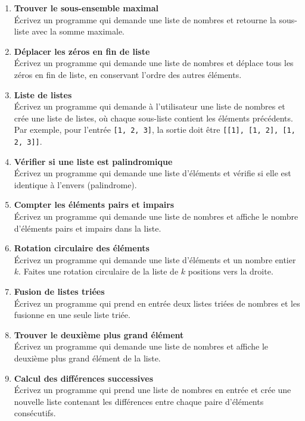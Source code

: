 \begin{enumerate}
    \item \textbf{Trouver le sous-ensemble maximal} \\
    Écrivez un programme qui demande une liste de nombres et retourne la sous-liste avec la somme maximale.

    \item \textbf{Déplacer les zéros en fin de liste} \\
    Écrivez un programme qui demande une liste de nombres et déplace tous les zéros en fin de liste, en conservant l'ordre des autres éléments.

    \item \textbf{Liste de listes} \\
    Écrivez un programme qui demande à l'utilisateur une liste de nombres et crée une liste de listes, où chaque sous-liste contient les éléments précédents. Par exemple, pour l'entrée \texttt{[1, 2, 3]}, la sortie doit être \texttt{[[1], [1, 2], [1, 2, 3]]}.

    \item \textbf{Vérifier si une liste est palindromique} \\
    Écrivez un programme qui demande une liste d'éléments et vérifie si elle est identique à l'envers (palindrome).

    \item \textbf{Compter les éléments pairs et impairs} \\
    Écrivez un programme qui demande une liste de nombres et affiche le nombre d'éléments pairs et impairs dans la liste.

    \item \textbf{Rotation circulaire des éléments} \\
    Écrivez un programme qui demande une liste d'éléments et un nombre entier $k$. Faites une rotation circulaire de la liste de $k$ positions vers la droite.

    \item \textbf{Fusion de listes triées} \\
    Écrivez un programme qui prend en entrée deux listes triées de nombres et les fusionne en une seule liste triée.

    \item \textbf{Trouver le deuxième plus grand élément} \\
    Écrivez un programme qui demande une liste de nombres et affiche le deuxième plus grand élément de la liste.

    \item \textbf{Calcul des différences successives} \\
    Écrivez un programme qui prend une liste de nombres en entrée et crée une nouvelle liste contenant les différences entre chaque paire d'éléments consécutifs.


\end{enumerate}
